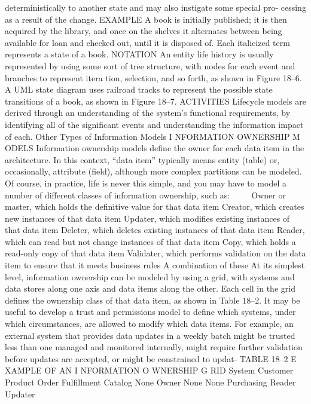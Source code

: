 deterministically to another state and may also instigate some special pro-
cessing as a result of the change.
EXAMPLE A book is initially published; it is then acquired by the
library, and once on the shelves it alternates between being available
for loan and checked out, until it is disposed of.
Each italicized term represents a state of a book.
NOTATION An entity life history is usually represented by using some sort
of tree structure, with nodes for each event and branches to represent itera tion,
selection, and so forth, as shown in Figure 18–6.
A UML state diagram uses railroad tracks to represent the possible state
transitions of a book, as shown in Figure 18–7.
ACTIVITIES Lifecycle models are derived through an understanding of the
system’s functional requirements, by identifying all of the significant events
and understanding the information impact of each.
Other Types of Information Models
I NFORMATION OWNERSHIP M ODELS Information ownership models define
the owner for each data item in the architecture. In this context, “data item”
typically means entity (table) or, occasionally, attribute (field), although more
complex partitions can be modeled. Of course, in practice, life is never this
simple, and you may have to model a number of different classes of
information ownership, such as:
Owner or master, which holds the definitive value for that data item
Creator, which creates new instances of that data item
Updater, which modifies existing instances of that data item
Deleter, which deletes existing instances of that data item
Reader, which can read but not change instances of that data item
Copy, which holds a read-only copy of that data item
Validater, which performs validation on the data item to ensure that it
meets business rules
A combination of these
At its simplest level, information ownership can be modeled by using a
grid, with systems and data stores along one axis and data items along the
other. Each cell in the grid defines the ownership class of that data item, as
shown in Table 18–2.
It may be useful to develop a trust and permissions model to define which
systems, under which circumstances, are allowed to modify which data items.
For example, an external system that provides data updates in a weekly batch
might be trusted less than one managed and monitored internally, might require
further validation before updates are accepted, or might be constrained to updat-
TABLE 18–2 E XAMPLE OF AN I NFORMATION O WNERSHIP G RID
System
 Customer
 Product
 Order
 Fulfillment
Catalog
 None
 Owner
 None
 None
Purchasing
 Reader
 Updater
